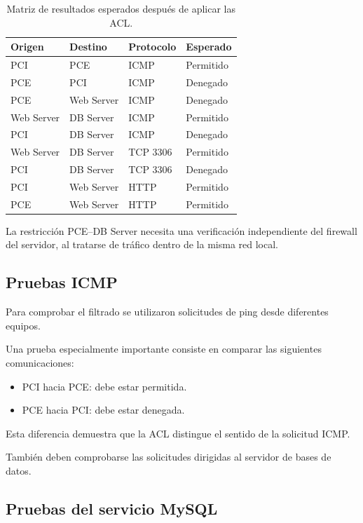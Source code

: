 \documentclass[12pt,a4paper]{article}
\begin{document}
\begin{table}[H]
\centering
\small
\begin{tabular}{|l|l|l|l|}
\hline
\textbf{Origen} &
\textbf{Destino} &
\textbf{Protocolo} &
\textbf{Esperado} \\
\hline
PCI & PCE & ICMP & Permitido \\
\hline
PCE & PCI & ICMP & Denegado \\
\hline
PCE & Web Server & ICMP & Denegado \\
\hline
Web Server & DB Server & ICMP & Permitido \\
\hline
PCI & DB Server & ICMP & Denegado \\
\hline
Web Server & DB Server & TCP 3306 & Permitido \\
\hline
PCI & DB Server & TCP 3306 & Denegado \\
\hline
PCI & Web Server & HTTP & Permitido \\
\hline
PCE & Web Server & HTTP & Permitido \\
\hline
\end{tabular}
\caption{Matriz de resultados esperados
después de aplicar las ACL.}
\end{table}

La restricción PCE--DB Server
necesita una verificación
independiente del firewall
del servidor, al tratarse
de tráfico dentro de la
misma red local.

\subsection{Pruebas ICMP}

Para comprobar el filtrado
se utilizaron solicitudes
de ping desde diferentes
equipos.

Una prueba especialmente
importante consiste en
comparar las siguientes
comunicaciones:

\begin{itemize}
    \item PCI hacia PCE:
    debe estar permitida.

    \item PCE hacia PCI:
    debe estar denegada.
\end{itemize}

Esta diferencia demuestra
que la ACL distingue
el sentido de la solicitud ICMP.

También deben comprobarse
las solicitudes dirigidas
al servidor de bases de datos.

\subsection{Pruebas del servicio MySQL}
\end{document}
